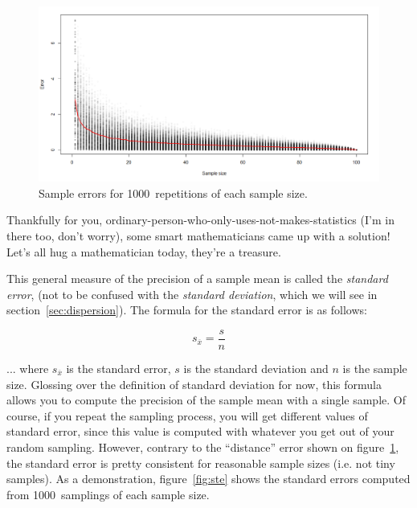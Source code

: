 \documentclass{report}
\begin{document}
			\begin{figure}[h]
				\centering
				\includegraphics[width=1.0\textwidth]{actual_error.png}
				\caption{Sample errors for 1000~repetitions of each sample size.}
				\label{fig:acte}
			\end{figure}
		
			Thankfully for you, ordinary-person-who-only-uses-not-makes-statistics (I'm in there too, don't worry), some smart mathematicians came up with a solution! Let's all hug a mathematician today, they're a treasure.
			
			This general measure of the precision of a sample mean is called the \emph{standard error}, (not to be confused with the \emph{standard deviation}, which we will see in section~\ref{sec:dispersion}). The formula for the standard error is as follows:
			
			\[
			s_{\overline{x}} = \frac{s}{n}
			\]
			
			... where $s_{\overline{x}}$ is the standard error, $s$ is the standard deviation and $n$ is the sample size. Glossing over the definition of standard deviation for now, this formula allows you to compute the precision of the sample mean with a single sample. Of course, if you repeat the sampling process, you will get different values of standard error, since this value is computed with whatever you get out of your random sampling. However, contrary to the ``distance'' error shown on figure~\ref{fig:acte}, the standard error is pretty consistent for reasonable sample sizes (i.e. not tiny samples). As a demonstration, figure~\ref{fig:ste} shows the standard errors computed from 1000~samplings of each sample size.
			
\end{document}
